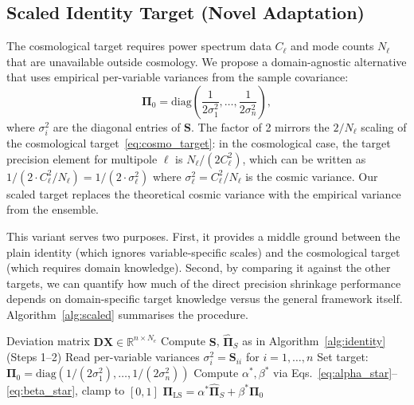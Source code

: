 \subsection{Scaled Identity Target (Novel Adaptation)}
\label{sec:scaled_target}

The cosmological target requires power spectrum data $C_\ell$ and mode counts $N_\ell$ that are unavailable outside cosmology. We propose a domain-agnostic alternative that uses empirical per-variable variances from the sample covariance:
\begin{equation}
\label{eq:scaled_target}
\boldsymbol{\Pi}_0 = \text{diag}\!\left(\frac{1}{2\sigma_1^2}, \ldots, \frac{1}{2\sigma_n^2}\right),
\end{equation}
where $\sigma_i^2$ are the diagonal entries of $\mathbf{S}$. The factor of 2 mirrors the $2/N_\ell$ scaling of the cosmological target~\eqref{eq:cosmo_target}: in the cosmological case, the target precision element for multipole $\ell$ is $N_\ell / (2 C_\ell^2)$, which can be written as $1 / (2 \cdot C_\ell^2 / N_\ell) = 1 / (2 \cdot \sigma_\ell^2)$ where $\sigma_\ell^2 = C_\ell^2 / N_\ell$ is the cosmic variance. Our scaled target replaces the theoretical cosmic variance with the empirical variance from the ensemble.

This variant serves two purposes. First, it provides a middle ground between the plain identity (which ignores variable-specific scales) and the cosmological target (which requires domain knowledge). Second, by comparing it against the other targets, we can quantify how much of the direct precision shrinkage performance depends on domain-specific target knowledge versus the general framework itself. Algorithm~\ref{alg:scaled} summarises the procedure.

\begin{algorithm}[t]
\caption{Direct Precision Shrinkage (Scaled Identity Target)}
\label{alg:scaled}
\begin{algorithmic}[1]
\REQUIRE Deviation matrix $\mathbf{DX} \in \mathbb{R}^{n \times N_e}$
\STATE Compute $\mathbf{S}$, $\hat{\boldsymbol{\Pi}}_S$ as in Algorithm~\ref{alg:identity} (Steps 1--2)
\STATE Read per-variable variances $\sigma_i^2 = \mathbf{S}_{ii}$ for $i = 1, \ldots, n$
\STATE Set target: $\boldsymbol{\Pi}_0 = \text{diag}(1/(2\sigma_1^2), \ldots, 1/(2\sigma_n^2))$
\STATE Compute $\alpha^*, \beta^*$ via Eqs.~\eqref{eq:alpha_star}--\eqref{eq:beta_star}, clamp to $[0,1]$
\RETURN $\boldsymbol{\Pi}_{\text{LS}} = \alpha^* \hat{\boldsymbol{\Pi}}_S + \beta^* \boldsymbol{\Pi}_0$
\end{algorithmic}
\end{algorithm}

